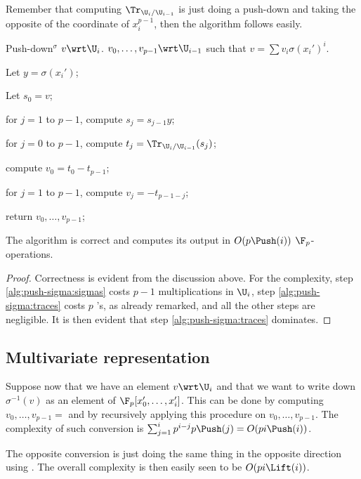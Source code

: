 Remember that computing $\Tr_{\U_i/\U_{i-1}}$ is just doing a push-down
and taking the opposite of the coordinate of $x_i^{p-1}$, then the
algorithm  follows easily.

\begin{algorithm}
  {Push-down$^\sigma$}
  {$v\wrt\U_i$.}
  {$v_0,\ldots,v_{p-1}\wrt\U_{i-1}$ such that $v = \sum v_i\sigma(x_i')^i$.}
\item Let $y = \sigma(x_i')$;
\item Let $s_0 = v$;
\item \label{alg:push-sigma:sigmas}for $j = 1$ to $p-1$, compute $s_j
  = s_{j-1}y$;
\item \label{alg:push-sigma:traces}for $j = 0$ to $p-1$, compute $t_j
  = \Tr_{\U_i/\U_{i-1}}(s_j)$;
\item compute $v_0 = t_0 - t_{p-1}$;
\item for $j = 1$ to $p-1$, compute $v_j = -t_{p-1-j}$;
\item return $v_0, \ldots, v_{p-1}$;
\end{algorithm}

\begin{theorem}
  The algorithm  is correct and computes its
  output in $O(p\Push(i))$ $\F_p$-operations.
\end{theorem}
\begin{proof}
  Correctness is evident from the discussion above. For the
  complexity, step \ref{alg:push-sigma:sigmas} costs $p-1$
  multiplications in $\U_i$, step \ref{alg:push-sigma:traces} costs
  $p$ 's, as already remarked, and all the other steps
  are negligible. It is then evident that step
  \ref{alg:push-sigma:traces} dominates.
\end{proof}


\subsection{Multivariate representation}
Suppose now that we have an element $v\wrt\U_i$ and that we want to
write down $\sigma^{-1}(v)$ as an element of
$\F_p[x_0',\ldots,x_i']$. This can be done by computing
$v_0,\ldots,v_{p-1}=$  and by recursively
applying this procedure on $v_0,\ldots,v_{p-1}$. The complexity of
such conversion is $\sum_{j=1}^ip^{i-j}p\Push(j) = O(pi\Push(i))$.

The opposite conversion is just doing the same thing in the opposite
direction using . The overall complexity is then
easily seen to be $O(pi\Lift(i))$.



%

